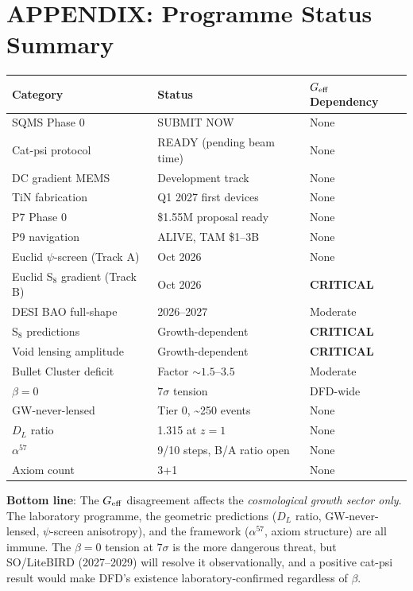 \documentclass[11pt]{article}
\newcommand{\Geff}{G_{\rm eff}}
\theoremstyle{remark}
\begin{document}
\newpage
\section*{APPENDIX: Programme Status Summary}

\begin{center}
\begin{tabular}{lll}
\toprule
\textbf{Category} & \textbf{Status} & \textbf{$\Geff$ Dependency} \\
\midrule
SQMS Phase 0 & SUBMIT NOW & None \\
Cat-psi protocol & READY (pending beam time) & None \\
DC gradient MEMS & Development track & None \\
TiN fabrication & Q1 2027 first devices & None \\
P7 Phase 0 & \$1.55M proposal ready & None \\
P9 navigation & ALIVE, TAM \$1--3B & None \\
\midrule
Euclid $\psi$-screen (Track A) & Oct 2026 & None \\
Euclid S$_8$ gradient (Track B) & Oct 2026 & \textbf{CRITICAL} \\
DESI BAO full-shape & 2026--2027 & Moderate \\
S$_8$ predictions & Growth-dependent & \textbf{CRITICAL} \\
Void lensing amplitude & Growth-dependent & \textbf{CRITICAL} \\
Bullet Cluster deficit & Factor $\sim 1.5$--$3.5$ & Moderate \\
\midrule
$\beta = 0$ & $7\sigma$ tension & DFD-wide \\
GW-never-lensed & Tier 0, \textasciitilde250 events & None \\
$D_L$ ratio & 1.315 at $z=1$ & None \\
$\alpha^{57}$ & 9/10 steps, B/A ratio open & None \\
Axiom count & 3+1 & None \\
\bottomrule
\end{tabular}
\end{center}

\medskip
\textbf{Bottom line}: The $\Geff$ disagreement affects the \emph{cosmological growth
sector only}. The laboratory programme, the geometric predictions ($D_L$ ratio,
GW-never-lensed, $\psi$-screen anisotropy), and the framework ($\alpha^{57}$, axiom
structure) are all immune. The $\beta = 0$ tension at $7\sigma$ is the more dangerous
threat, but SO/LiteBIRD (2027--2029) will resolve it observationally, and a positive
cat-psi result would make DFD's existence laboratory-confirmed regardless of $\beta$.
\end{document}

